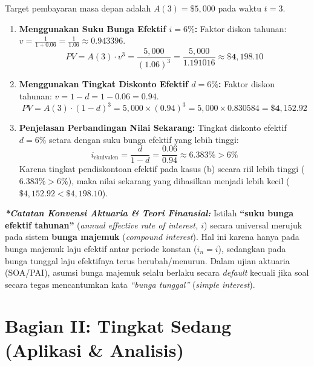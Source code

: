 \documentclass[11pt,a4paper]{article}
\begin{document}
\begin{solutionbox}[Soal 3]
Target pembayaran masa depan adalah $A(3) = \$5{,}000$ pada waktu $t = 3$.
\begin{enumerate}[label=(\alph*)]
    \item \textbf{Menggunakan Suku Bunga Efektif $i = 6\%$:}
    Faktor diskon tahunan: $v = \frac{1}{1 + 0.06} = \frac{1}{1.06} \approx 0.943396$.
    \begin{equation*}
        PV = A(3) \cdot v^3 = \frac{5{,}000}{(1.06)^3} = \frac{5{,}000}{1.191016} \approx \mathbf{\$4{,}198.10}
    \end{equation*}

    \item \textbf{Menggunakan Tingkat Diskonto Efektif $d = 6\%$:}
    Faktor diskon tahunan: $v = 1 - d = 1 - 0.06 = 0.94$.
    \begin{equation*}
        PV = A(3) \cdot (1 - d)^3 = 5{,}000 \times (0.94)^3 = 5{,}000 \times 0.830584 = \mathbf{\$4{,}152.92}
    \end{equation*}

    \item \textbf{Penjelasan Perbandingan Nilai Sekarang:}
    Tingkat diskonto efektif $d = 6\%$ setara dengan suku bunga efektif yang lebih tinggi:
    \begin{equation*}
        i_{\text{ekuivalen}} = \frac{d}{1 - d} = \frac{0.06}{0.94} \approx 6.383\% > 6\%
    \end{equation*}
    Karena tingkat pendiskontoan efektif pada kasus (b) secara riil lebih tinggi ($6.383\% > 6\%$), maka nilai sekarang yang dihasilkan menjadi lebih kecil ($\$4{,}152.92 < \$4{,}198.10$).
\end{enumerate}

\vspace{0.4em}
\noindent\textit{\textbf{*Catatan Konvensi Aktuaria \& Teori Finansial:}} 
Istilah \textbf{``suku bunga efektif tahunan''} (\textit{annual effective rate of interest, $i$}) secara universal merujuk pada sistem \textbf{bunga majemuk} (\textit{compound interest}). Hal ini karena hanya pada bunga majemuk laju efektif antar periode konstan ($i_n = i$), sedangkan pada bunga tunggal laju efektifnya terus berubah/menurun. Dalam ujian aktuaria (SOA/PAI), asumsi bunga majemuk selalu berlaku secara \emph{default} kecuali jika soal secara tegas mencantumkan kata \textit{``bunga tunggal''} (\textit{simple interest}).
\end{solutionbox}

\newpage
\section*{Bagian II: Tingkat Sedang (Aplikasi \& Analisis)}
\end{document}
